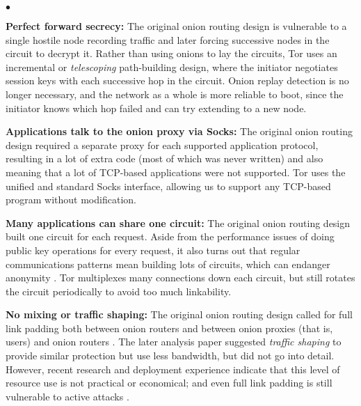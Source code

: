 \documentclass[times,10pt,twocolumn]{article}
\newenvironment{tightlist}{\begin{list}{$\bullet$}{
  \setlength{\itemsep}{0mm}
    \setlength{\parsep}{0mm}
    }}{\end{list}}
\begin{document}
\begin{tightlist}

\item \textbf{Perfect forward secrecy:} The original onion routing
design is vulnerable to a single hostile node recording traffic and later
forcing successive nodes in the circuit to decrypt it. Rather than using
onions to lay the circuits, Tor uses an incremental or \emph{telescoping}
path-building design, where the initiator negotiates session keys with
each successive hop in the circuit. Onion replay detection is no longer
necessary, and the network as a whole is more reliable to boot, since
the initiator knows which hop failed and can try extending to a new node.

\item \textbf{Applications talk to the onion proxy via Socks:}
The original onion routing design required a separate proxy for each
supported application protocol, resulting in a lot of extra code (most
of which was never written) and also meaning that a lot of TCP-based
applications were not supported. Tor uses the unified and standard Socks
\cite{socks4,socks5} interface, allowing us to support any TCP-based
program without modification.

\item \textbf{Many applications can share one circuit:} The original
onion routing design built one circuit for each request. Aside from the
performance issues of doing public key operations for every request, it
also turns out that regular communications patterns mean building lots
of circuits, which can endanger anonymity \cite{wright03}.
Tor multiplexes many
connections down each circuit, but still rotates the circuit periodically
to avoid too much linkability.

\item \textbf{No mixing or traffic shaping:} The original onion routing
design called for full link padding both between onion routers and between
onion proxies (that is, users) and onion routers \cite{or-jsac98}. The
later analysis paper \cite{or-pet02} suggested \emph{traffic shaping}
to provide similar protection but use less bandwidth, but did not go
into detail. However, recent research \cite{econymics} and deployment
experience \cite{freedom} indicate that this level of resource
use is not practical or economical; and even full link padding is still
vulnerable to active attacks \cite{defensive-dropping}.


\end{tightlist}
\end{document}
